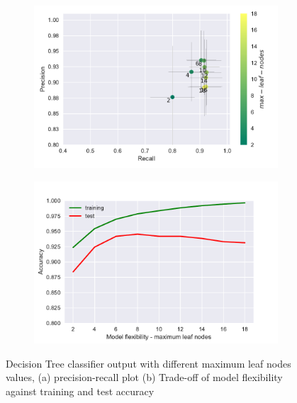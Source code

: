 \documentclass[12pt, a4paper]{scrartcl}
\begin{document}
\begin{figure}[h]
    \centering
    \begin{subfigure}{0.45\textwidth}
        \includegraphics[width=\textwidth]{prec_recall_dt_maxleafnodes}
        \caption{}
        \label{fig:prec_recall_dt_maxleafnodes}
    \end{subfigure}
    \begin{subfigure}{0.45\textwidth}
        \includegraphics[width=\textwidth]{tradeoff_dt_maxleafnodes}
        \caption{}
        \label{fig:tradeoff_dt_maxleafnodes}
    \end{subfigure}
    \caption{Decision Tree classifier output with different maximum leaf nodes values, (a) precision-recall plot (b) Trade-off of model flexibility against training and test accuracy}\label{fig:DT_maxleafnodes}
\end{figure}
\end{document}
